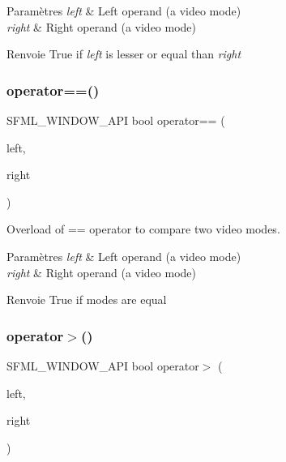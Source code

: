 \begin{DoxyParams}{Paramètres}
{\em left} & Left operand (a video mode) \\
\hline
{\em right} & Right operand (a video mode)\\
\hline
\end{DoxyParams}
\begin{DoxyReturn}{Renvoie}
True if {\itshape left} is lesser or equal than {\itshape right} 
\end{DoxyReturn}
\mbox{\label{classsf_1_1VideoMode_a03c51c119811ffd4403c6e2bcbd4ceaf}} 
\subsubsection{\texorpdfstring{operator==()}{operator==()}}
{\footnotesize\ttfamily S\+F\+M\+L\+\_\+\+W\+I\+N\+D\+O\+W\+\_\+\+A\+PI bool operator== (\begin{DoxyParamCaption}\item[{const \hyperlink{classsf_1_1VideoMode}{Video\+Mode} \&}]{left,  }\item[{const \hyperlink{classsf_1_1VideoMode}{Video\+Mode} \&}]{right }\end{DoxyParamCaption})\hspace{0.3cm}{\ttfamily [related]}}



Overload of == operator to compare two video modes. 


\begin{DoxyParams}{Paramètres}
{\em left} & Left operand (a video mode) \\
\hline
{\em right} & Right operand (a video mode)\\
\hline
\end{DoxyParams}
\begin{DoxyReturn}{Renvoie}
True if modes are equal 
\end{DoxyReturn}
\mbox{\label{classsf_1_1VideoMode_ab6e5b2c65a428a4b56de8551b3706a36}} 
\subsubsection{\texorpdfstring{operator$>$()}{operator>()}}
{\footnotesize\ttfamily S\+F\+M\+L\+\_\+\+W\+I\+N\+D\+O\+W\+\_\+\+A\+PI bool operator$>$ (\begin{DoxyParamCaption}\item[{const \hyperlink{classsf_1_1VideoMode}{Video\+Mode} \&}]{left,  }\item[{const \hyperlink{classsf_1_1VideoMode}{Video\+Mode} \&}]{right }\end{DoxyParamCaption})\hspace{0.3cm}{\ttfamily [related]}}



